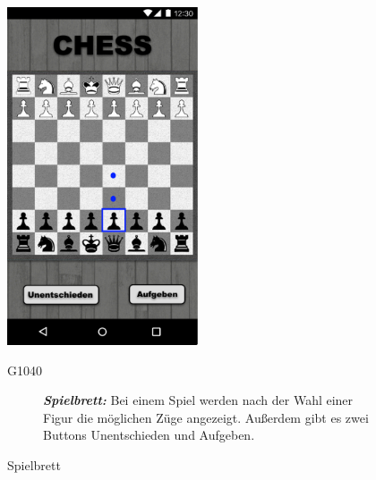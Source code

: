 \documentclass[parskip=full]{scrartcl}
\begin{document}
\begin{figure}[htp]
	\begin{minipage}[t]{6cm}
		\vspace{0pt}
		\includegraphics[height=100mm]{ingame.png}
		\caption{Spielbrett}
		\label{fig:Spielbrett}
	\end{minipage}
	\hfill
	\begin{minipage}[t]{6cm}
		\vspace{0pt}
		\begin{description}
			\item[G1040] \textbf{\textit{Spielbrett: }} Bei einem Spiel werden nach der Wahl einer Figur die möglichen Züge angezeigt. Außerdem gibt es zwei Buttons Unentschieden und Aufgeben.
		\end{description}
	\end{minipage}
\end{figure}
\end{document}
